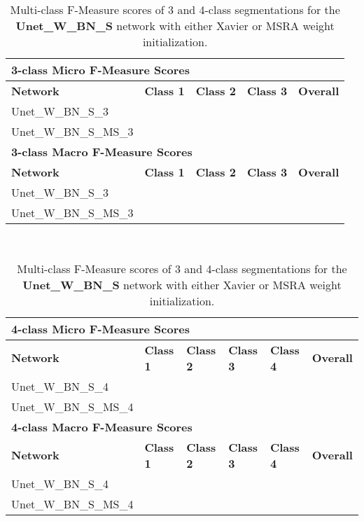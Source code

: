 \begin {table}
	\begin{flushleft}
		\begin {tabular}[!htb]{|l|l|l|l|l|}
			\hline\multicolumn{5}{|l|}{\textbf{3-class Micro F-Measure Scores}} \\ \hline
			\textbf{Network}& \textbf{Class 1}& \textbf{Class 2}& \textbf{Class 3}& \textbf{Overall} \\ \hline
			Unet\_W\_BN\_S\_3& &  & & \\ \hline
			Unet\_W\_BN\_S\_MS\_3& &  & & \\ \hline
			\multicolumn{5}{|l|}{\textbf{3-class Macro F-Measure Scores}} \\ \hline
			\textbf{Network}& \textbf{Class 1}& \textbf{Class 2}& \textbf{Class 3}& \textbf{Overall} \\ \hline
			Unet\_W\_BN\_S\_3& & & & \\ \hline
			Unet\_W\_BN\_S\_MS\_3& & & & \\ \hline
		\end {tabular}
		\vspace{0.5cm}\\
		\begin {tabular}[!htb]{|l|l|l|l|l|l|}
			\hline\multicolumn{6}{|l|}{\textbf{4-class Micro F-Measure Scores}} \\ \hline
			\textbf{Network}& \textbf{Class 1}& \textbf{Class 2}& \textbf{Class 3}& \textbf{Class 4}& \textbf{Overall} \\ \hline
			Unet\_W\_BN\_S\_4& & & & & \\ \hline
			Unet\_W\_BN\_S\_MS\_4& & & & & \\ \hline
			\multicolumn{6}{|l|}{\textbf{4-class Macro F-Measure Scores}} \\ \hline
			\textbf{Network}& \textbf{Class 1}& \textbf{Class 2}& \textbf{Class 3}& \textbf{Class 4}& \textbf{Overall} \\ \hline
			Unet\_W\_BN\_S\_4& & & & & \\ \hline
			Unet\_W\_BN\_S\_MS\_4& & & & & \\ \hline
		\end {tabular}
	\end {flushleft}
\caption[Multi-class F-Measure scores for networks with Xavier and MSRA weight initialization.]{Multi-class F-Measure scores of 3 and 4-class segmentations for  the \textbf{Unet\_W\_BN\_S} network with either Xavier or MSRA weight initialization.}
\label{tab:results4}
\end {table}

